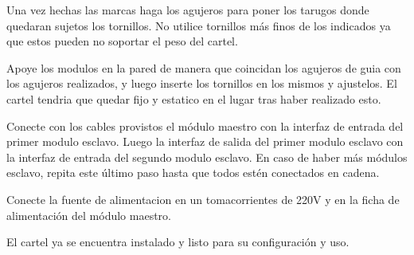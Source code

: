

Una vez hechas las marcas haga los agujeros para poner los tarugos donde quedaran sujetos los tornillos. No utilice tornillos más finos de los indicados ya que estos pueden no soportar el peso del cartel.


Apoye los modulos en la pared de manera que coincidan los agujeros de guia con los agujeros realizados, y luego inserte los tornillos en los mismos y ajustelos. El cartel tendria que quedar fijo y estatico en el lugar tras haber realizado esto.


Conecte con los cables provistos el módulo maestro con la interfaz de entrada del primer modulo esclavo. Luego la interfaz de salida del primer modulo esclavo con la interfaz de entrada del segundo modulo esclavo. En caso de haber más módulos esclavo, repita este último paso hasta que todos estén conectados en cadena.

Conecte la fuente de alimentacion en un tomacorrientes de 220V y en la ficha de alimentación del módulo maestro.

El cartel ya se encuentra instalado y listo para su configuración y uso.
